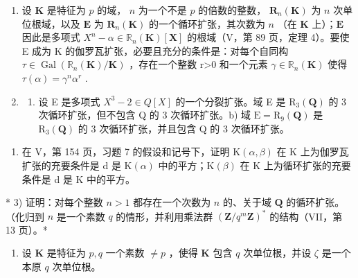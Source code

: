 \BourbakiExerciseGroup

\begin{enumerate}
\def\labelenumi{\arabic{enumi})}
\item
  设 \(\mathbf{K}\) 是特征为 \(p\) 的域， \(n\) 为一个不是 \(p\) 的倍数的整数， \(\mathbf{R}_n(\mathbf{K})\) 为 \(n\) 次单位根域，以及 \(\mathbf{E}\) 为 \(\mathbf{R}_n(\mathbf{K})\) 的一个循环扩张，其次数为 \(n\) （在 \(\mathbf{K}\) 上）；\(\mathbf{E}\) 因此是多项式 \(X^{n}-\alpha\in\mathbb{R}_{n}(\mathbf{K})[\mathbf{X}]\) 的根域（V，第 89 页，定理 4）。要使 E 成为 K 的伽罗瓦扩张，必要且充分的条件是：对每个自同构 \(\tau\in\operatorname{Gal}\left(\mathbb{R}_{n}(\mathbf{K})/\mathbf{K}\right)\) ，存在一个整数 r\textgreater0 和一个元素 \(\gamma\in\mathbb{R}_{n}(\mathbf{K})\) 使得 \(\tau(\alpha)=\gamma^{n}\alpha^{r}\) .
\item
  \begin{enumerate}
  \def\labelenumii{\alph{enumii})}
  \tightlist
  \item
    设 E 是多项式 \(X^{3}-2\in Q[X]\) 的一个分裂扩张。域 E 是 \(\mathrm{R}_{3}(\mathbf{Q})\) 的 3 次循环扩张，但不包含 Q 的 3 次循环扩张。b) 域 \(\mathrm{E}=\mathrm{R}_{9}(\mathbf{Q})\) 是 \(\mathrm{R}_{3}(\mathbf{Q})\) 的 3 次循环扩张，并且包含 Q 的 3 次循环扩张。
  \end{enumerate}
\end{enumerate}

\begin{enumerate}
\def\labelenumi{\alph{enumi})}
\setcounter{enumi}{2}
\tightlist
\item
  在 V，第 154 页，习题 7 的假设和记号下，证明 \(\mathrm{K}(\alpha,\beta)\) 在 K 上为伽罗瓦扩张的充要条件是 d 是 \(\mathrm{K}(\alpha)\) 中的平方；\(\mathrm{K}(\beta)\) 在 K 上为循环扩张的充要条件是 d 是 K 中的平方。
\end{enumerate}

* 3) 证明：对每个整数 \(n > 1\) 都存在一个次数为 \(n\) 的、关于域 \(\mathbf{Q}\) 的循环扩张。（化归到 \(n\) 是一个素数 \(q\) 的情形，并利用乘法群 \((\mathbf{Z} / q^m\mathbf{Z})^*\) 的结构（VII，第 13 页）。*

\begin{enumerate}
\def\labelenumi{\arabic{enumi})}
\setcounter{enumi}{3}
\tightlist
\item
  设 \(\mathbf{K}\) 是特征为 \(p, q\) 一个素数 \(\neq p\) ，使得 \(\mathbf{K}\) 包含 \(q\) 次单位根，并设 \(\zeta\) 是一个本原 \(q\) 次单位根。
\end{enumerate}

